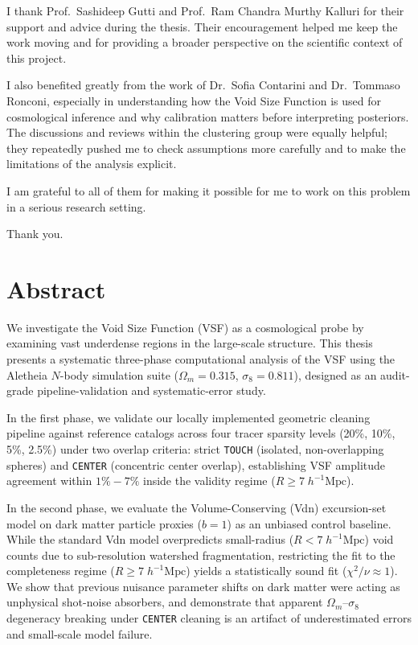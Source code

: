 \documentclass[12pt]{report}
\begin{document}
I thank Prof.\ Sashideep Gutti and Prof.\ Ram Chandra Murthy Kalluri for their support and advice during the thesis. Their encouragement helped me keep the work moving and for providing a broader perspective on the scientific context of this project.

I also benefited greatly from the work of Dr.\ Sofia Contarini and Dr.\ Tommaso Ronconi, especially in understanding how the Void Size Function is used for cosmological inference and why calibration matters before interpreting posteriors. The discussions and reviews within the clustering group were equally helpful; they repeatedly pushed me to check assumptions more carefully and to make the limitations of the analysis explicit.

I am grateful to all of them for making it possible for me to work on this problem in a serious research setting.

\bigskip\noindent Thank you.

\tableofcontents
\hypersetup{pageanchor=true}
\clearpage

\chapter*{Abstract}

We investigate the Void Size Function (VSF) as a cosmological probe by examining vast underdense regions in the large-scale structure. This thesis presents a systematic three-phase computational analysis of the VSF using the Aletheia $N$-body simulation suite ($\Omega_m=0.315$, $\sigma_8=0.811$), designed as an audit-grade pipeline-validation and systematic-error study.

In the first phase, we validate our locally implemented geometric cleaning pipeline against reference catalogs across four tracer sparsity levels (20\%, 10\%, 5\%, 2.5\%) under two overlap criteria: strict \texttt{TOUCH} (isolated, non-overlapping spheres) and \texttt{CENTER} (concentric center overlap), establishing VSF amplitude agreement within $1\% - 7\%$ inside the validity regime ($R \ge 7\;h^{-1}\mathrm{Mpc}$).

In the second phase, we evaluate the Volume-Conserving (Vdn) excursion-set model on dark matter particle proxies ($b=1$) as an unbiased control baseline. While the standard Vdn model overpredicts small-radius ($R < 7\;h^{-1}\mathrm{Mpc}$) void counts due to sub-resolution watershed fragmentation, restricting the fit to the completeness regime ($R \ge 7\;h^{-1}\mathrm{Mpc}$) yields a statistically sound fit ($\chi^2/\nu \approx 1$). We show that previous nuisance parameter shifts on dark matter were acting as unphysical shot-noise absorbers, and demonstrate that apparent $\Omega_m$--$\sigma_8$ degeneracy breaking under \texttt{CENTER} cleaning is an artifact of underestimated errors and small-scale model failure.
\end{document}
